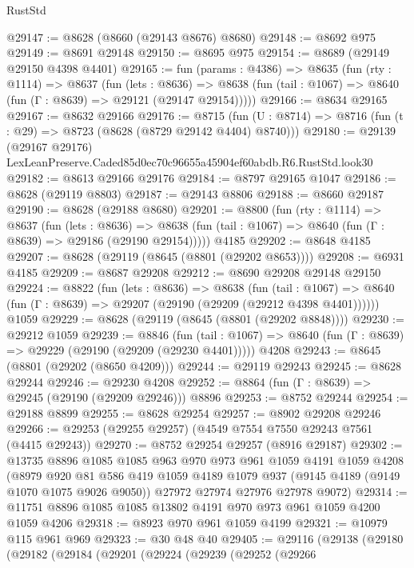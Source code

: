 \begin{lexlean}{RustStd}
\begin{coremodule}
@29147 := @8628 (@8660 (@29143 @8676) @8680)
@29148 := @8692 @975
@29149 := @8691 @29148
@29150 := @8695 @975
@29154 := @8689 (@29149 @29150 @4398 @4401)
@29165 := fun (params : @4386) =>
  @8635
    (fun (rty : @1114) =>
    @8637
      (fun (lets : @8636) =>
      @8638 (fun (tail : @1067) => @8640 (fun (Γ : @8639) => @29121 (@29147 @29154)))))
@29166 := @8634 @29165
@29167 := @8632 @29166
@29176 := @8715
    (fun (U : @8714) => @8716 (fun (t : @29) => @8723 (@8628 (@8729 @29142 @4404) @8740)))
@29180 := @29139 (@29167 @29176) LexLeanPreserve.Caded85d0ec70c96655a45904ef60abdb.R6.RustStd.look30
@29182 := @8613 @29166 @29176
@29184 := @8797 @29165 @1047
@29186 := @8628 (@29119 @8803)
@29187 := @29143 @8806
@29188 := @8660 @29187
@29190 := @8628 (@29188 @8680)
@29201 := @8800
    (fun (rty : @1114) =>
    @8637
      (fun (lets : @8636) =>
      @8638 (fun (tail : @1067) => @8640 (fun (Γ : @8639) => @29186 (@29190 @29154)))))
    @4185
@29202 := @8648 @4185
@29207 := @8628 (@29119 (@8645 (@8801 (@29202 @8653))))
@29208 := @6931 @4185
@29209 := @8687 @29208
@29212 := @8690 @29208 @29148 @29150
@29224 := @8822
    (fun (lets : @8636) =>
    @8638
      (fun (tail : @1067) =>
      @8640 (fun (Γ : @8639) => @29207 (@29190 (@29209 (@29212 @4398 @4401))))))
    @1059
@29229 := @8628 (@29119 (@8645 (@8801 (@29202 @8848))))
@29230 := @29212 @1059
@29239 := @8846
    (fun (tail : @1067) => @8640 (fun (Γ : @8639) => @29229 (@29190 (@29209 (@29230 @4401)))))
    @4208
@29243 := @8645 (@8801 (@29202 (@8650 @4209)))
@29244 := @29119 @29243
@29245 := @8628 @29244
@29246 := @29230 @4208
@29252 := @8864 (fun (Γ : @8639) => @29245 (@29190 (@29209 @29246))) @8896
@29253 := @8752 @29244
@29254 := @29188 @8899
@29255 := @8628 @29254
@29257 := @8902 @29208 @29246
@29266 := @29253 (@29255 @29257) (@4549 @7554 @7550 @29243 @7561 (@4415 @29243))
@29270 := @8752 @29254 @29257 (@8916 @29187)
@29302 := @13735
    @8896
    @1085
    @1085
    @963
    @970
    @973
    @961
    @1059
    @4191
    @1059
    @4208
    (@8979
      @920
      @81
      @586
      @419
      @1059
      @4189
      @1079
      @937
      (@9145 @4189 (@9149 @1070 @1075 @9026 @9050))
      @27972
      @27974
      @27976
      @27978
      @9072)
@29314 := @11751 @8896 @1085 @1085 @13802 @4191 @970 @973 @961 @1059 @4200 @1059 @4206
@29318 := @8923 @970 @961 @1059 @4199
@29321 := @10979 @115 @961 @969
@29323 := @30 @48 @40
@29405 := @29116
    (@29138
      (@29180
        (@29182
          (@29184
            (@29201
              (@29224
                (@29239
                  (@29252
                    (@29266

\end{coremodule}
\end{lexlean}
